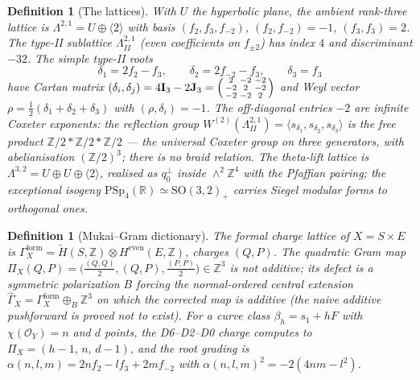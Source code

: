 \documentclass[11pt]{article}
\providecommand{\cO}{\mathcal{O}}
\providecommand{\bR}{\mathbb{R}}
\providecommand{\bZ}{\mathbb{Z}}
\providecommand{\SO}{\mathrm{SO}}
\providecommand{\HypPlan}{U}
\newtheorem{definition}[theorem]{Definition}
\begin{document}
\begin{definition}[The lattices]
With $\HypPlan$ the hyperbolic plane, the ambient rank-three lattice
is $\Lambda^{2,1}=\HypPlan\oplus\langle2\rangle$ with basis
$(f_2,f_3,f_{-2})$, $(f_2,f_{-2})=-1$, $(f_3,f_3)=2$. The type-II
sublattice $\Lambda^{2,1}_{II}$ (even coefficients on $f_{\pm2}$) has
index $4$ and discriminant $-32$. The simple type-II roots
\[
\delta_1=2f_2-f_3,\qquad \delta_2=2f_{-2}-f_3,\qquad \delta_3=f_3
\]
have Cartan matrix
$(\delta_i,\delta_j)=4\mathbf I_3-2\mathbf J_3=
\begin{psmallmatrix}2&-2&-2\\-2&2&-2\\-2&-2&2\end{psmallmatrix}$ and
Weyl vector $\rho=\tfrac12(\delta_1+\delta_2+\delta_3)$ with
$(\rho,\delta_i)=-1$. The off-diagonal entries $-2$ are infinite
Coxeter exponents: the reflection group
$W^{(2)}(\Lambda^{2,1}_{II})=\langle s_{\delta_1},s_{\delta_2},
s_{\delta_3}\rangle$ is the free product $\bZ/2*\bZ/2*\bZ/2$
--- the universal Coxeter group on three generators, with
abelianisation $(\bZ/2)^3$; there is no braid relation. The theta-lift
lattice is $\Lambda^{3,2}=\HypPlan\oplus\HypPlan\oplus\langle2\rangle$,
realised as $q_0^{\perp}$ inside $\wedge^2\bZ^4$ with the Pfaffian
pairing; the exceptional isogeny $\mathrm{PSp}_4(\bR)\simeq\SO(3,2)_+$
carries Siegel modular forms to orthogonal ones.
\end{definition}

\begin{definition}[Mukai--Gram dictionary]
The formal charge lattice of $X=S\times E$ is
$\Gamma^{\mathrm{form}}_X=\widetilde H(S,\bZ)\otimes
H^{\mathrm{even}}(E,\bZ)$, charges $(Q,P)$. The quadratic Gram map
$\Pi_X(Q,P)=\bigl(\tfrac{(Q,Q)}2,(Q,P),\tfrac{(P,P)}2\bigr)\in\bZ^3$
is not additive; its defect is a symmetric polarization $B$ forcing
the normal-ordered central extension
$\widehat\Gamma_X=\Gamma^{\mathrm{form}}_X\oplus_B\bZ^3$ on which the
corrected map is additive \textup{(the naive additive pushforward is
proved not to exist)}. For a curve class $\beta_h=s_1+hF$ with
$\chi(\cO_Y)=n$ and $d$ points, the D6--D2--D0 charge computes to
$\Pi_X=(h-1,\,n,\,d-1)$, and the root grading is
$\alpha(n,l,m)=2nf_2-lf_3+2mf_{-2}$ with
$\alpha(n,l,m)^2=-2(4nm-l^2)$.
\end{definition}
\end{document}
